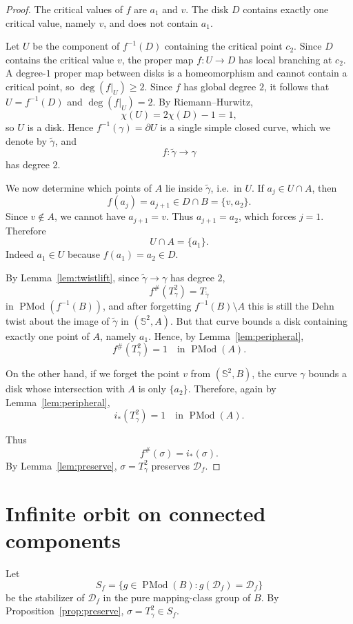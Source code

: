 \documentclass[11pt]{article}
\newcommand{\Sph}{\mathbb S^2}
\newcommand{\D}{\mathcal D}
\newcommand{\PMod}{\operatorname{PMod}}
\begin{document}
\begin{proof}
The critical values of $f$ are $a_1$ and $v$.  The disk $D$ contains exactly one critical value, namely $v$, and does not contain $a_1$.

Let $U$ be the component of $f^{-1}(D)$ containing the critical point $c_2$.  Since $D$ contains the critical value $v$, the proper map $f:U\to D$ has local branching at $c_2$.  A degree-$1$ proper map between disks is a homeomorphism and cannot contain a critical point, so $\deg(f|_U)\ge2$.  Since $f$ has global degree $2$, it follows that $U=f^{-1}(D)$ and $\deg(f|_U)=2$.  By Riemann--Hurwitz,
\[
  \chi(U)=2\chi(D)-1=1,
\]
so $U$ is a disk.  Hence $f^{-1}(\gamma)=\partial U$ is a single simple closed curve, which we denote by $\widetilde\gamma$, and
\[
  f:\widetilde\gamma\longrightarrow\gamma
\]
has degree $2$.

We now determine which points of $A$ lie inside $\widetilde\gamma$, i.e.\ in $U$.  If $a_j\in U\cap A$, then
\[
  f(a_j)=a_{j+1}\in D\cap B=\{v,a_2\}.
\]
Since $v\notin A$, we cannot have $a_{j+1}=v$.  Thus $a_{j+1}=a_2$, which forces $j=1$.  Therefore
\[
  U\cap A=\{a_1\}.
\]
Indeed $a_1\in U$ because $f(a_1)=a_2\in D$.

By Lemma~\ref{lem:twistlift}, since $\widetilde\gamma\to\gamma$ has degree $2$,
\[
  f^{\#}(T_\gamma^2)=T_{\widetilde\gamma}
\]
in $\PMod(f^{-1}(B))$, and after forgetting $f^{-1}(B)\setminus A$ this is still the Dehn twist about the image of $\widetilde\gamma$ in $(\Sph,A)$.  But that curve bounds a disk containing exactly one point of $A$, namely $a_1$.  Hence, by Lemma~\ref{lem:peripheral},
\[
  f^{\#}(T_\gamma^2)=1\quad\text{in }\PMod(A).
\]

On the other hand, if we forget the point $v$ from $(\Sph,B)$, the curve $\gamma$ bounds a disk whose intersection with $A$ is only $\{a_2\}$.  Therefore, again by Lemma~\ref{lem:peripheral},
\[
  i_*(T_\gamma^2)=1\quad\text{in }\PMod(A).
\]

Thus
\[
  f^{\#}(\sigma)=i_*(\sigma).
\]
By Lemma~\ref{lem:preserve}, $\sigma=T_\gamma^2$ preserves $\D_f$.
\end{proof}

\section{Infinite orbit on connected components}

Let
\[
  S_f=\{g\in\PMod(B): g(\D_f)=\D_f\}
\]
be the stabilizer of $\D_f$ in the pure mapping-class group of $B$.  By Proposition~\ref{prop:preserve}, $\sigma=T_\gamma^2\in S_f$.
\end{document}
